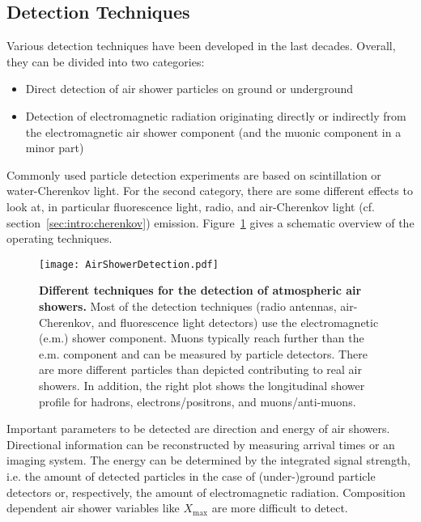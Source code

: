\subsection{Detection Techniques}

Various detection techniques have been developed in the last decades. Overall, they can be divided into two categories:
\begin{itemize}
	\item Direct detection of air shower particles on ground or underground
	\item Detection of electromagnetic radiation originating directly or indirectly from the electromagnetic air shower component (and the muonic component in a minor part)
\end{itemize}
Commonly used particle detection experiments are based on scintillation or water-Cherenkov light.
For the second category, there are some different effects to look at, in particular fluorescence light, radio, and air-Cherenkov light (cf. section~\ref{sec:intro:cherenkov}) emission. Figure~\ref{intro:airshower_detection_sketch} gives a schematic overview of the operating techniques.~\cite{airshowers:schroeder}\\

\begin{figure}[h]
	\texttt{[image: AirShowerDetection.pdf]}
	\caption[Different techniques for air shower detection]{\textbf{Different techniques for the detection of atmospheric air showers.} \cite{airshowers:schroeder} Most of the detection techniques (radio antennas, air-Cherenkov, and fluorescence light detectors) use the electromagnetic (e.m.) shower component. Muons typically reach further than the e.m. component and can be measured by particle detectors. There are more different particles than depicted contributing to real air showers. In addition, the right plot shows the longitudinal shower profile for hadrons, electrons/positrons, and muons/anti-muons.}	
	\label{intro:airshower_detection_sketch}
\end{figure}

Important parameters to be detected are direction and energy of air showers. Directional information can be reconstructed by measuring arrival times or an imaging system. The energy can be determined by the integrated signal strength, i.e. the amount of detected particles in the case of (under-)ground particle detectors or, respectively, the amount of electromagnetic radiation. Composition dependent air shower variables like $X_\text{max}$ are more difficult to detect.

